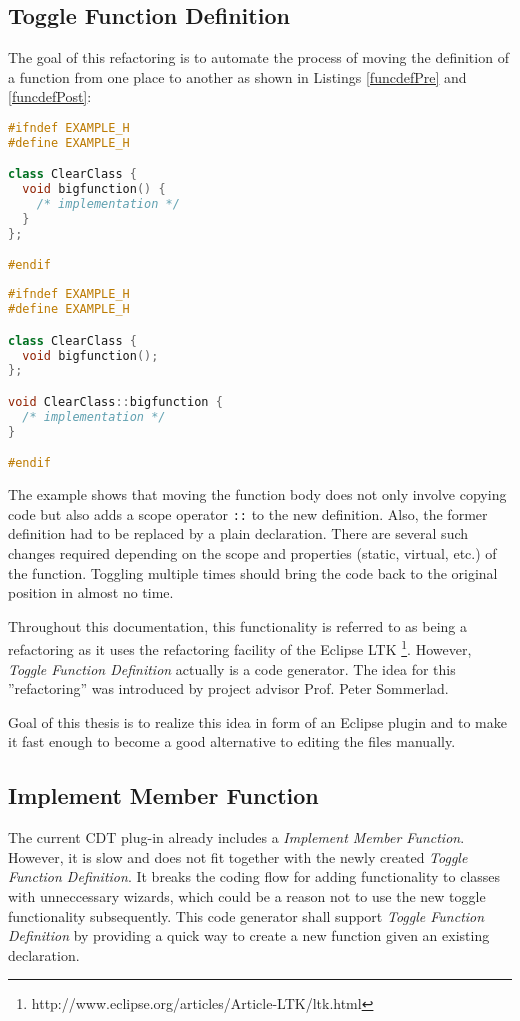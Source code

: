 \subsection{Toggle Function Definition}
The goal of this refactoring is to automate the process of moving the definition 
of a function from one place to another as shown in Listings
\ref{funcdefPre} and \ref{funcdefPost}:\newline

\begin{lstlisting}[caption={Initial situation: member function defined inside a
class},label={funcdefPre},language=C++]
#ifndef EXAMPLE_H
#define EXAMPLE_H

class ClearClass {
  void bigfunction() {
    /* implementation */
  }
};

#endif
\end{lstlisting}

\begin{lstlisting}[caption={Situation after toggling: member function defined
separately, outside the class},label={funcdefPost},language=C++]
#ifndef EXAMPLE_H
#define EXAMPLE_H

class ClearClass {
  void bigfunction();
};

void ClearClass::bigfunction {
  /* implementation */
}

#endif
\end{lstlisting}

The example shows that moving the function body does not only involve copying 
code but also adds a scope operator \texttt{::} to the new definition. Also, the 
former definition had to be replaced by a plain declaration. There are several 
such changes required depending on the scope and properties (static, virtual, 
etc.) of the function. Toggling multiple times should bring the code back to the 
original position in almost no time. 

Throughout this documentation, this functionality is referred to as being a 
refactoring as it uses the refactoring facility of the Eclipse LTK
\footnote{http://www.eclipse.org/articles/Article-LTK/ltk.html}. However, 
\textit{Toggle Function Definition} actually is a code generator. The idea for 
this ''refactoring'' was introduced by project advisor Prof. Peter Sommerlad.

Goal of this thesis is to realize this idea in form of an Eclipse plugin and to 
make it fast enough to become a good alternative to editing the files manually. 

\subsection{Implement Member Function}
The current CDT plug-in already includes a \textit{Implement Member Function}.
However, it is slow and does not fit together with the newly created 
\textit{Toggle Function Definition}. It breaks the coding flow for adding 
functionality to classes with unneccessary wizards, which could be a reason not 
to use the new toggle functionality subsequently. This code generator shall 
support \textit{Toggle Function Definition} by providing a quick way to create a 
new function given an existing declaration.

